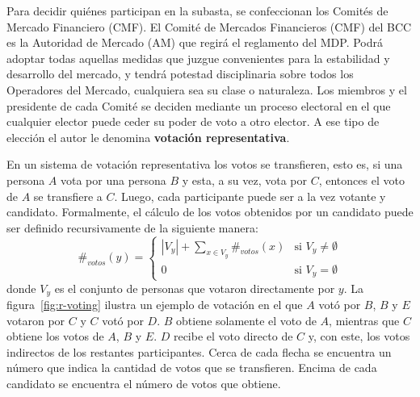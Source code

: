 Para decidir qui\'enes participan en la subasta, se confeccionan los Comit\'es de Mercado Financiero (CMF).  El Comité de Mercados Financieros (CMF) del BCC es la Autoridad de Mercado (AM) que regirá el reglamento del MDP. Podrá adoptar todas aquellas medidas que juzgue convenientes para la estabilidad y desarrollo del mercado, y tendrá potestad disciplinaria sobre todos los Operadores del Mercado, cualquiera sea su clase o naturaleza. Los miembros y el presidente de cada Comit\'e se deciden mediante un proceso electoral en el que cualquier elector puede ceder su poder de voto a otro elector. A ese tipo de elecci\'on el autor le denomina \textbf{votaci\'on representativa}.  


En un sistema de votaci\'on representativa  los votos se transfieren, esto es, si una persona $A$ vota por una persona $B$ y esta, a su vez, vota por  $C$, entonces el voto de $A$ se transfiere a $C$. Luego, cada participante puede ser a la vez votante y candidato. Formalmente, el c\'alculo de los votos obtenidos por un candidato puede ser definido recursivamente de la siguiente manera:
\begin{equation}\label{eq:votes-count}
    \#_{votos}(y) = \begin{cases}
        |V_y| + \underset{x \in V_y}{\sum} \#_{votos}(x) & \text{si } V_y \neq \emptyset \\
        0 & \text{si } V_y = \emptyset 
    \end{cases}
\end{equation}
donde $V_y$ es el conjunto de personas que votaron directamente por $y$. La figura~\ref{fig:r-voting} ilustra un ejemplo de votación en el que $A$ votó por $B$, $B$ y $E$ votaron por $C$ y $C$ votó por $D$. $B$ obtiene solamente el voto de $A$, mientras que $C$ obtiene los votos de $A$, $B$ y $E$. $D$ recibe el voto directo de $C$ y, con este,  los votos indirectos de los restantes participantes. Cerca de cada flecha se encuentra un n\'umero que indica la cantidad de votos que se transfieren. Encima de cada candidato se encuentra el n\'umero de votos que obtiene.


